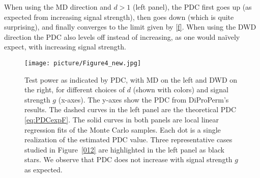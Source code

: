 \documentclass[12pt]{article}
\begin{document}
{When using the MD direction and $d>1$ (left panel), the PDC first goes up (as expected from increasing signal strength), then goes down (which is quite surprising), and finally converges to the limit given by \eqref{f}. When using the DWD direction the PDC also levels off instead of increasing, as one would na\"ively expect, with increasing signal strength. 
\begin{figure}[H]
  \centering
  \texttt{[image: picture/Figure4\_new.jpg]}\\
   \caption{Test power as indicated by PDC, with MD on the left and DWD on the right, for different choices of $d$ (shown with colors) and signal strength $g$ (x-axes).   The y-axes show the PDC from DiProPerm's results. The dashed curves in the left panel are the theoretical PDC \eqref{eq:PDCexpF}. The solid curves in both panels are local linear regression fits of the Monte Carlo samples. Each dot is a single realization of the estimated PDC value. Three representative cases studied in Figure~\ref{012} are highlighted in the left panel as black stars. We observe that PDC does not increase with signal strength $g$ as expected.}
  \label{011}
\end{figure}



}
\end{document}
